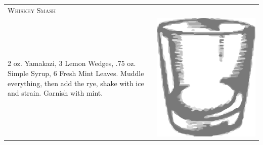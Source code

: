 \documentclass{article}
\begin{document}
\begin{tabular}{p{2in} p{0.5in}}
\multicolumn{2}{p{3in}}{\centering\Huge\textsc{Whiskey Smash}} \\ 
  \vspace{-0.1in}2 oz. Yamakazi, 3 Lemon Wedges, .75 oz.  Simple Syrup, 6 Fresh Mint Leaves. Muddle everything, then add the rye, shake with ice and strain. Garnish with mint. &
  \vspace{-0.1in} \includegraphics{rocks_glass.png}
\end{tabular}
\end{document}
